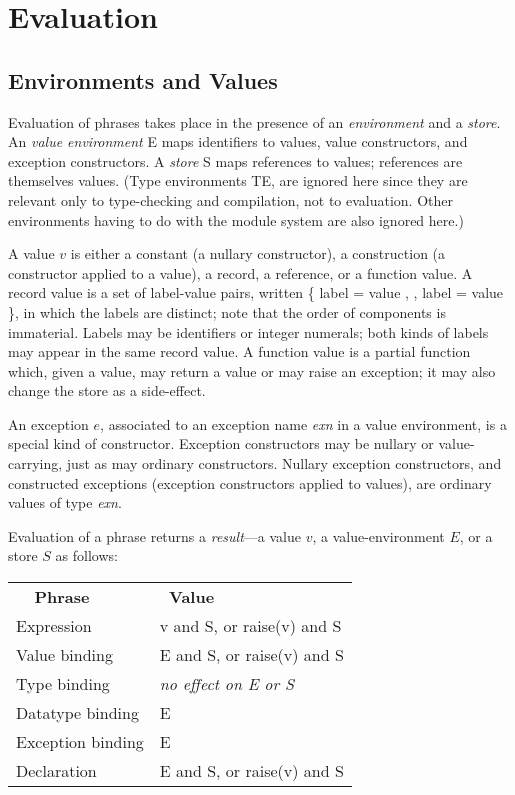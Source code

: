 \chapter{Evaluation}
\label{eval}
\section{Environments and Values}
Evaluation of phrases takes place in the presence of an {\em environment} and a
{\em store}.  An {\em value environment} E maps identifiers to values, value constructors, and
exception constructors.  A {\em store} S maps references to values; references
are themselves values.  (Type environments TE, are
ignored here since they are relevant only to
type-checking and compilation, not to evaluation.  Other environments
having to do with the module system are also ignored here.)

A value $v$ is either a constant (a nullary constructor), a
construction (a constructor applied to a value), a record, a
reference, or a function value.  A record value is a set of
label-value pairs, written \{ label = value ,  , label = value \},
in which the labels are distinct; note that the order of components
is immaterial.  Labels may be identifiers or integer numerals; both
kinds of labels may appear in the same record value.  A function
value is a partial function which, given a value, may return a
value or may raise an exception; it may also change the store as a side-effect.

An exception $e$, associated to an exception name  {\em exn} in a value
environment, is a special kind of constructor.  Exception
constructors may be nullary or value-carrying, just as may ordinary
constructors.  Nullary exception constructors, and constructed
exceptions (exception constructors applied to values), are ordinary
values of type {\em exn}.

Evaluation of a phrase returns a {\em result}---a value $v$,
a value-environment $E$, or a store $S$ as follows:

\begin{tabular}{l l}
{\bf \ \ Phrase}&{\bf \  Value} \\
Expression & v and S, or raise(v) and S\\
Value binding & E and S, or raise(v) and S\\
Type binding & {\it no effect on E or S} \\
Datatype binding & E \\
Exception binding & E \\
Declaration & E and S, or raise(v) and S
\end{tabular}

